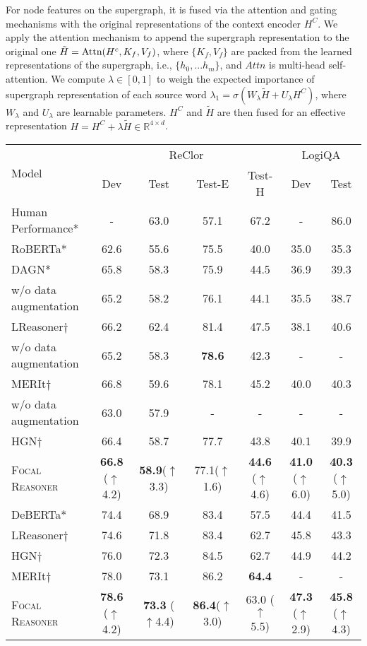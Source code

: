 \documentclass[11pt]{article}
\begin{document}
For node features on the supergraph, it is fused via the attention and gating mechanisms with the original representations of the context encoder $H^C$. We apply the attention mechanism to append the supergraph representation to the original one $\tilde{H} = \textup{Attn}(H^c,K_f,V_f)$,
where $\{K_f,V_f\}$ are packed from the learned representations of the supergraph, i.e., $\{h_0,...h_m\}$, and $Attn$ is multi-head self-attention. We compute $\lambda\in[0,1]$ to weigh the expected importance of supergraph representation of each source word $\lambda_1 = \sigma(W_\lambda \tilde{H}+U_\lambda H^C)$,
where $W_\lambda$ and $U_\lambda$ are learnable parameters. $H^C$ and $\tilde{H}$ are then fused for an effective representation $H = H^C+\lambda\tilde{H}\in \mathbb{R}^{4\times d}$.


\begin{table*}[htb]
\vspace{-3mm}
\small
\centering\centering\setlength{\tabcolsep}{9.5pt}
\begin{tabular}{lcccccc}
\toprule
\multirow{2}{*}{Model} &
\multicolumn{4}{c}{ReClor} & \multicolumn{2}{c}{LogiQA}\\
\cmidrule{2-5}
\cmidrule{6-7}
 & Dev & Test & Test-E & Test-H & Dev & Test \\ 
\midrule
Human Performance*& - & 63.0 & 57.1 & 67.2  & -&86.0 \\
\midrule
RoBERTa*  &62.6&55.6&75.5&40.0 & 35.0&35.3  \\
DAGN*  &65.8&58.3&75.9&44.5&36.9&39.3 \\
\quad w/o data augmentation &65.2&58.2&76.1&44.1 & 35.5&38.7\\
LReasoner$\dagger$ & 66.2 & 62.4 &81.4 & 47.5 & 38.1 & 40.6 \\
\quad w/o data augmentation & 65.2 & 58.3 & \textbf{78.6} & 42.3 & - & - \\
MERIt$\dagger$ & 66.8&59.6&78.1&45.2&40.0&40.3 \\
\quad w/o data augmentation & 63.0&57.9&-&-&-&- \\
HGN$\dagger$ &66.4 & 58.7 & 77.7 & 43.8 & 40.1 & 39.9 \\
\textsc{Focal Reasoner}&\textbf{66.8} ($\uparrow$4.2) &\textbf{58.9}($\uparrow$3.3) &77.1($\uparrow$1.6) & \textbf{44.6} ($\uparrow$4.6) &\textbf{41.0} ($\uparrow$6.0) &\textbf{40.3} ($\uparrow$5.0)\\
\midrule
DeBERTa*  & 74.4 & 68.9 & 83.4 & 57.5 & 44.4 & 41.5 \\
LReasoner$\dagger$ &74.6 & 71.8 & 83.4 & 62.7 & 45.8 & 43.3 \\
HGN$\dagger$ &76.0 & 72.3 & 84.5 & 62.7 & 44.9 & 44.2 \\
MERIt$\dagger$ &78.0&73.1&86.2&\textbf{64.4}&-&-\\
\textsc{Focal Reasoner}&\textbf{78.6} ($\uparrow$4.2) & \textbf{73.3} ($\uparrow$4.4)&\textbf{86.4}($\uparrow$3.0)&63.0 ($\uparrow$5.5) & \textbf{47.3} ($\uparrow$2.9)&\textbf{45.8} ($\uparrow$4.3)\\



\end{tabular}
\end{table*}
\end{document}
